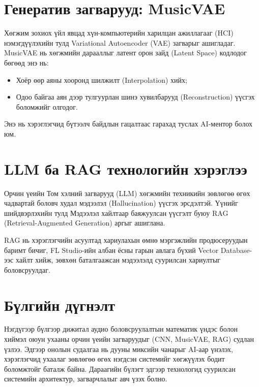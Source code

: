 \section{Генератив загварууд: MusicVAE}

Хөгжим зохиох үйл явцад хүн-компьютерийн харилцан ажиллагааг (HCI) нэмэгдүүлэхийн тулд Variational Autoencoder (VAE) загварыг ашигладаг. MusicVAE нь хөгжмийн дарааллыг латент орон зайд (Latent Space) кодлодог бөгөөд энэ нь:
\begin{itemize}
    \item Хоёр өөр аяны хооронд шилжилт (Interpolation) хийх;
    \item Одоо байгаа аян дээр тулгуурлан шинэ хувилбарууд (Reconstruction) үүсгэх боломжийг олгодог.
\end{itemize}
Энэ нь хэрэглэгчид бүтээлч байдлын гацалтаас гарахад туслах AI-ментор болох юм.

\section{LLM ба RAG технологийн хэрэглээ}

Орчин үеийн Том хэлний загварууд (LLM) хөгжмийн техникийн зөвлөгөө өгөх чадвартай боловч худал мэдээлэл (Hallucination) үүсгэх эрсдэлтэй. Үүнийг шийдвэрлэхийн тулд Мэдээлэл хайлтаар баяжуулсан үүсгэлт буюу RAG (Retrieval-Augmented Generation) аргыг ашиглана.



RAG нь хэрэглэгчийн асуултад хариулахын өмнө мэргэжлийн продюсеруудын баримт бичиг, FL Studio-ийн албан ёсны гарын авлага бүхий Vector Database-ээс хайлт хийж, зөвхөн баталгаажсан мэдээлэлд суурилсан хариултыг боловсруулдаг.

\section{Бүлгийн дүгнэлт}

Нэгдүгээр бүлгээр дижитал аудио боловсруулалтын математик үндэс болон хиймэл оюун ухааны орчин үеийн загваруудыг (CNN, MusicVAE, RAG) судлан үзлээ. Эдгээр онолын судалгаа нь дууны миксийн чанарыг AI-аар үнэлэх, хэрэглэгчид ухаалаг зөвлөгөө өгөх нэгдсэн системийг хөгжүүлэх бодит боломжтойг баталж байна. Дараагийн бүлэгт эдгээр технологид суурилсан системийн архитектур, загварчлалыг авч үзэх болно.